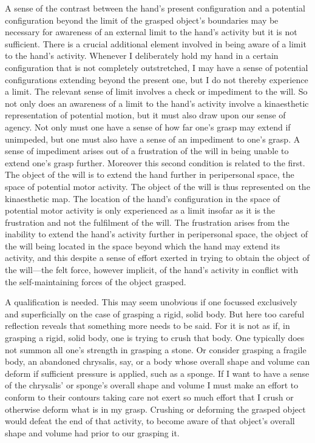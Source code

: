 A sense of the contrast between the hand's present configuration and a potential configuration beyond the limit of the grasped object's boundaries may be necessary for awareness of an external limit to the hand's activity but it is not sufficient. There is a crucial additional element involved in being aware of a limit to the hand's activity. Whenever I deliberately hold my hand in a certain configuration that is not completely outstretched, I may have a sense of potential configurations extending beyond the present one, but I do not thereby experience a limit. The relevant sense of limit involves a check or impediment to the will. So not only does an awareness of a limit to the hand's activity involve a kinaesthetic representation of potential motion, but it must also draw upon our sense of agency. Not only must one have a sense of how far one's grasp may extend if unimpeded, but one must also have a sense of an impediment to one's grasp. A sense of impediment arises out of a frustration of the will in being unable to extend one's grasp further. Moreover this second condition is related to the first. The object of the will is to extend the hand further in peripersonal space, the space of potential motor activity. The object of the will is thus represented on the kinaesthetic map. The location of the hand's configuration in the space of potential motor activity is only experienced as a limit insofar as it is the frustration and not the fulfilment of the will. The frustration arises from the inability to extend the hand's activity further in peripersonal space, the object of the will being located in the space beyond which the hand may extend its activity, and this despite a sense of effort exerted in trying to obtain the object of the will---the felt force, however implicit, of the hand's activity in conflict with the self-maintaining forces of the object grasped.

A qualification is needed. This may seem unobvious if one focussed exclusively and superficially on the case of grasping a rigid, solid body. But here too careful reflection reveals that something more needs to be said. For it is not as if, in grasping a rigid, solid body, one is trying to crush that body. One typically does not summon all one's strength in grasping a stone. Or consider grasping a fragile body, an abandoned chrysalis, say, or a body whose overall shape and volume can deform if sufficient pressure is applied, such as a sponge. If I want to have a sense of the chrysalis' or sponge's overall shape and volume I must make an effort to conform to their contours taking care not exert so much effort that I crush or otherwise deform what is in my grasp. Crushing or deforming the grasped object would defeat the end of that activity, to become aware of that object's overall shape and volume had prior to our grasping it. 


